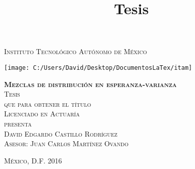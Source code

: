 \documentclass[11pt]{book}
\begin{document}









\title{Tesis} %

\begin{titlepage}
\begin{center}

\textsc{\Large Instituto Tecnológico Autónomo de México}\\[4em]

\begin{center}
\texttt{[image: C:/Users/David/Desktop/DocumentosLaTex/itam]}
\end{center}

\vspace{4em}

\textsc{\huge \textbf{Mezclas de distribución en esperanza-varianza}}\\[4em]

\textsc{\large Tesis}\\[1em]

\textsc{que para obtener el título}\\[1em]

\textsc{Licenciado en Actuaría}\\[1em]

\textsc{presenta}\\[1em]

\textsc{\Large David Edgardo Castillo Rodríguez}\\[1em]

\textsc{\large Asesor: Juan Carlos Martínez Ovando}

\end{center}

\vspace*{\fill}
\textsc{México, D.F. \hspace*{\fill} 2016}

\end{titlepage}
\end{document}
